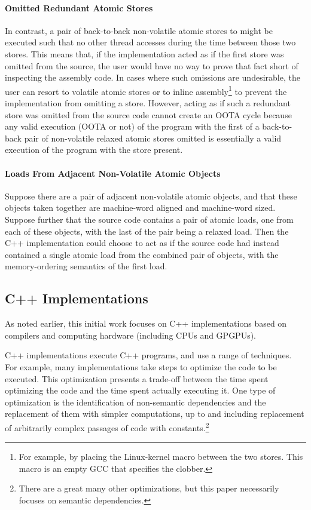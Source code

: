 \documentclass[10]{article}
\begin{document}
\paragraph{Omitted Redundant Atomic Stores}
In contrast, a pair of back-to-back non-volatile atomic stores to 
might be executed such that no other thread accesses 
during the time between those two stores.
This means that, if the implementation acted as if the first store was omitted
from the source, the user would have no way to prove that fact short of
inspecting the assembly code.
In cases where such omissions are undesirable, the user can resort to
volatile atomic stores or to inline assembly\footnote{
	For example, by placing the Linux-kernel  macro
	between the two stores.
	This macro is an empty GCC  that specifies the 
	clobber.}
to prevent the implementation from omitting a store.
However, acting as if such a redundant store was omitted from the source
code cannot create an OOTA cycle because any valid execution (OOTA or not)
of the program with the first of a back-to-back pair of non-volatile
relaxed atomic stores omitted is essentially a valid execution of the
program with the store present.

\paragraph{Loads From Adjacent Non-Volatile Atomic Objects}

Suppose there are a pair of adjacent non-volatile atomic objects,
and that these objects taken together are machine-word aligned
and machine-word sized.
Suppose further that the source code contains a pair of atomic
loads, one from each of these objects, with the last of the pair
being a relaxed load.
Then the C++ implementation could choose to act as if the source code
had instead contained a single atomic load from the combined
pair of objects, with the memory-ordering semantics of the first load.

\subsection{C++ Implementations}
\label{sec:C++ Implementations}

As noted earlier, this initial work focuses on C++ implementations based
on compilers and computing hardware (including CPUs and GPGPUs).

C++ implementations execute C++ programs, and use a range of techniques.
For example, many implementations take steps to optimize the code to
be executed.
This optimization presents a trade-off between the time spent optimizing
the code and the time spent actually executing it.
One type of optimization is the identification of non-semantic dependencies
and the replacement of them with simpler computations, up to and including
replacement of arbitrarily complex passages of code with constants.\footnote{
	There are a great many other optimizations, but this paper
	necessarily focuses on semantic dependencies.}
\end{document}
